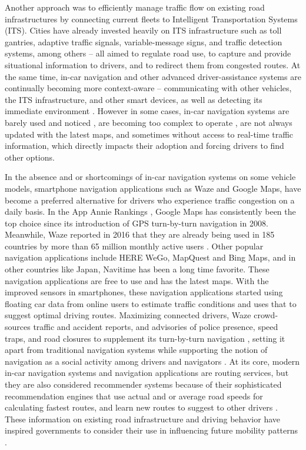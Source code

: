 Another approach was to efficiently manage traffic flow on existing road infrastructures by connecting current fleets to Intelligent Transportation Systems (ITS). Cities have already invested heavily on ITS infrastructure such as toll gantries, adaptive traffic signals, variable-message signs, and traffic detection systems, among others -- all aimed to regulate road use, to capture and provide situational information to drivers, and to redirect them from congested routes. At the same time, in-car navigation and other advanced driver-assistance systems are continually becoming more context-aware -- communicating with other vehicles, the ITS infrastructure, and other smart devices, as well as detecting its immediate environment \cite{Alghamdi2012, Monreal2014, Ali2018}. However in some cases,  in-car navigation systems are barely used and noticed \cite{J.D.Power2012VehicleDeclines}, are becoming too complex to operate \cite{J.D.Power2017ImprovementsFinds}, are not always updated with the latest maps, and sometimes without access to real-time traffic information, which directly impacts their adoption and forcing drivers to find other options.

In the absence and or shortcomings of in-car navigation systems on some vehicle models, smartphone navigation applications such as Waze and Google Maps, have become a preferred alternative for drivers who experience traffic congestion on a daily basis. In the App Annie Rankings \cite{2018GoogleAnnieb}, Google Maps has consistently been the top choice since its introduction of GPS turn-by-turn navigation in 2008. Meanwhile, Waze reported in 2016 that they are already being used in 185 countries by more than 65 million monthly active users \cite{Waze2016DriverIndex}. Other popular navigation applications include HERE WeGo, MapQuest and Bing Maps, and in other countries like Japan, Navitime has been a long time favorite. These navigation applications are free to use and has the latest maps. With the improved sensors in smartphones, these navigation applications started using floating car data from online users to estimate traffic conditions and uses that to suggest optimal driving routes. Maximizing connected drivers, Waze crowd-sources traffic and accident reports, and advisories of police presence, speed traps, and road closures to supplement its turn-by-turn navigation \cite{Levine2014SystemExchange, Valdes-Dapena2016MostDirections}, setting it apart from traditional navigation systems while supporting the notion of navigation as a social activity among drivers and navigators \cite{Forlizzi2010WhereTurn}. At its core, modern in-car navigation systems and navigation applications are routing services, but they are also considered recommender systems because of their sophisticated recommendation engines that use actual and or average road speeds for calculating fastest routes, and learn new routes to suggest to other drivers \cite{2018RoutingServer}. These information on existing road infrastructure and driving behavior have inspired governments to consider their use in influencing future mobility patterns \cite{Ben-Elia2015ResponseReview,Attard2016TheSystems}.

